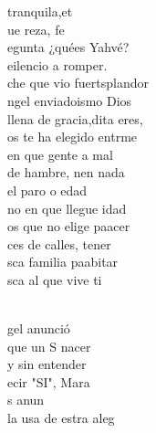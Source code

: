 \begin{cancion}%
	tranquila,et\\
	ue  reza, fe\\
	egunta ¿quées Yahvé? \\
	eilencio a romper.\\
	che que vio fuertsplandor\\
	ngel enviadoismo Dios\\
	llena de gracia,dita eres,\\
	os te ha elegido entrme\\
\jump
	en que gente a mal\\
	de hambre, nen nada\\
	 el paro o edad\\
	no en que llegue idad\\
	os que  no elige paacer\\
	ces de calles, tener\\
	sca familia paabitar\\
	sca al que vive ti\\\jump\\
	\begin{chorus}%
	gel anunció \\
	que un S nacer\\
	y sin entender \\
	ecir "SI", Mara\\
	s  anun \\
	la usa de estra aleg\\

\end{chorus}
\end{cancion}
